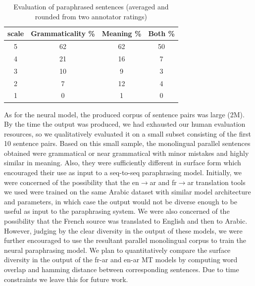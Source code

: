 \documentclass[11pt,letterpaper]{article}
\begin{document}
\begin{table}
\begin{tabular}{|c|c|c|c|}
\hline
scale & {\small{Grammaticality}} \% &  {\small{Meaning}}  \% & Both \% \\ 
\hline
5 & 62 &	62	& 50 \\
\hline
4 & 21 &	16	& 7 \\
\hline
3 & 10 	 & 9 	& 3 \\
\hline
2 & 7 & 12 &	4 \\
\hline
1 & 0	&  1  &	0 \\
\hline
\end{tabular}
\caption{Evaluation of paraphrased sentences (averaged and rounded from two annotator ratings)}
\label{evaltable}
\end{table}

As for the neural model,  the produced corpus of sentence pairs was large (2M). By the time the output was produced, we had exhausted our human evaluation resources, so we qualitatively evaluated it on a small subset consisting of the first 10 sentence pairs. Based on this small sample, the monolingual parallel sentences obtained were grammatical or near grammatical with minor mistakes and highly similar in meaning. Also, they were sufficiently different in surface form which encouraged their use as input to a seq-to-seq paraphrasing model. Initially, we were concerned of the possibility that the en$\rightarrow$ar and fr$\rightarrow$ar translation tools we used were trained on the same Arabic dataset with similar model architecture and parameters, in which case the output would not be diverse enough to be useful as input to the paraphrasing system. We were also concerned of the possibility that the French source was translated to English and then to Arabic. However, judging by the clear diversity in the output of these models, we were further encouraged to use the resultant  parallel monolingual corpus to train the neural paraphrasing model. We plan to quantitatively compare the surface diversity in the output of the fr-ar and en-ar MT models by computing word overlap and hamming distance between corresponding sentences. Due to time constraints we leave this for future work.
\end{document}
